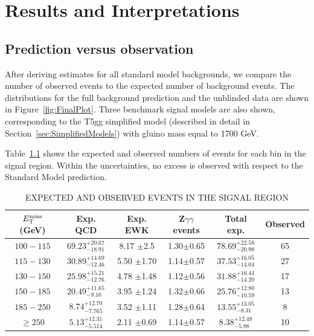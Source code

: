 \chapter{Results and Interpretations}
\label{chap:Results}


\section{Prediction versus observation}
\label{sec:fullCount}
After deriving estimates for all standard model backgrounds, we compare the number of 
observed events to the expected number of background events. 
The \ETmiss distributions for the full background prediction and the unblinded data are
shown in Figure~\ref{fig:FinalPlot}. Three benchmark signal models are also shown, 
corresponding to the T5gg simplified model 
(described in detail in Section~\ref{sec:SimplifiedModels}) with gluino mass equal to 1700 GeV.

Table~\ref{tab:ExpObs} shows the expected and observed numbers of events for each bin in the signal region.
Within the uncertainties, no excess is observed with respect to the Standard Model prediction.


\begin{table}[ht]
    \caption{EXPECTED AND OBSERVED EVENTS IN THE SIGNAL REGION}
    \centering
    \begin{tabular}{ |c|c|c|c|c|c|}
        \hline
        $E_{\mathrm{T}}^{\text{miss}}$ (GeV) & Exp. QCD & Exp. EWK &  Z$\gamma\gamma$ events  &Total exp. & Observed \\ [0.5ex]
        \hline
        $100 - 115$ & ${69.23}^{+20.67}_{-18.91}$ & 8.17 $\pm$2.5  & 1.30$\pm$0.65 & ${ 78.69 }^{+ 22.58 }_{- 20.98 }$ & 65  \\
        $115 - 130$ & ${30.89}^{+14.69}_{-12.46}$ & 5.50 $\pm$1.70 & 1.14$\pm$0.57 & ${ 37.53 }^{+ 16.05 }_{- 14.04 }$ & 27 \\
        $130 - 150$ & ${25.98}^{+15.21}_{-12.76}$ & 4.78 $\pm$1.48 & 1.12$\pm$0.56 & ${ 31.88 }^{+ 16.44 }_{- 14.20 }$ & 17 \\
        $150 - 185$ & ${20.49}^{+11.65}_{-9.16} $ & 3.95 $\pm$1.24 & 1.32$\pm$0.66 & ${ 25.76 }^{+ 12.80 }_{- 10.59 }$ & 13 \\
        $185 -  250$& ${8.74} ^{+12.70}_{-7.765}$ & 3.52 $\pm$1.11 & 1.28$\pm$0.64 & ${ 13.55 }^{+ 13.05 }_{- 8.31  }$ & 8  \\
        $\geq 250$  & ${5.13} ^{+12.31}_{-5.514}$ & 2.11 $\pm$0.69 & 1.14$\pm$0.57 & ${ 8.38  }^{+ 12.48 }_{- 5.88  }$ & 10 \\
        \hline
    \end{tabular}
    \label{tab:ExpObs}
\end{table}

